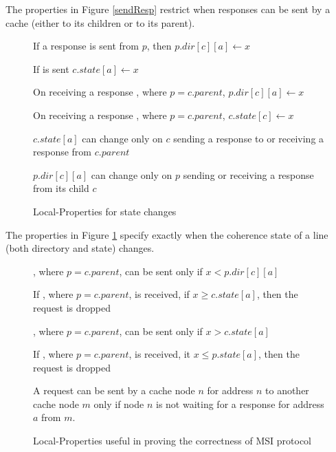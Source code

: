 The properties in Figure \ref{sendResp} restrict when responses can be sent by
 a cache (either to its children or to its parent).

\begin{figure}\small
\begin{inv}
If a response  is sent from $p$, then $p.dir[c][a] \gets x$\label{cSendRespPost}
\end{inv}
\begin{inv}
If  is sent $c.state[a] \gets x$\label{pSendRespPost}
\end{inv}
\begin{inv}
On receiving a response , where $p = c.parent$, $p.dir[c][a]
\gets x$\label{pRecvResp}
\end{inv}
\begin{inv}
On receiving a response , where $p = c.parent$, $c.state[c]
\gets x$\label{cRecvResp}
\end{inv}
\begin{inv}
$c.state[a]$ can change only on $c$ sending a response to or receiving a
response from $c.parent$\label{cState}
\end{inv}
\begin{inv}
$p.dir[c][a]$ can change only on $p$ sending or receiving a response from
its child $c$\label{pState}
\end{inv}
\caption{Local-Properties for state changes}
\label{stateChange}
\end{figure}

The properties in Figure \ref{stateChange} specify exactly when the coherence state of
a line (both directory and state) changes.

\begin{figure}\small
\begin{inv}
, where $p = c.parent$, can be sent only if $x < p.dir[c][a]$\label{pSendReqPre}
\end{inv}
\begin{inv}
If , where $p = c.parent$, is received, if $x \ge c.state[a]$,
then the request is dropped\label{pSendReqPost}
\end{inv}
\begin{inv}
, where $p = c.parent$, can be sent only if $x > c.state[a]$\label{cSendReqPre}
\end{inv}
\begin{inv}
If , where $p = c.parent$, is received, it $x \le p.state[a]$,
then the request is dropped\label{cSendReqPost}
\end{inv}
\begin{inv}
A request can be sent by a cache node $n$ for address $n$ to another cache node $m$ only if
node $n$ is not waiting for a response for address $a$ from $m$.
\label{nodoublereq}
\end{inv}
\caption{Local-Properties useful in proving the correctness of MSI protocol}
\label{sendReq}
\end{figure}

